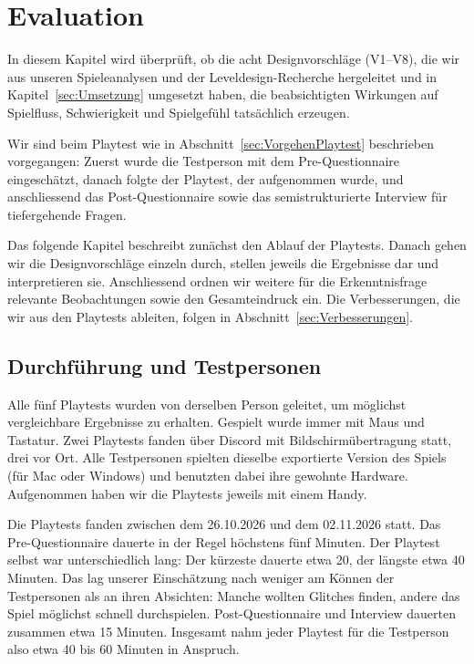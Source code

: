 \documentclass[../Main.tex]{subfiles}
\begin{document}
\section{Evaluation} \label{sec:Evaluation}

In diesem Kapitel wird überprüft, ob die acht Designvorschläge (V1--V8), die wir aus unseren Spieleanalysen und der Leveldesign-Recherche hergeleitet und in Kapitel~\ref{sec:Umsetzung} umgesetzt haben, die beabsichtigten Wirkungen auf Spielfluss, Schwierigkeit und Spielgefühl tatsächlich erzeugen.

Wir sind beim Playtest wie in Abschnitt~\ref{sec:VorgehenPlaytest} beschrieben vorgegangen: Zuerst wurde die Testperson mit dem Pre-Questionnaire eingeschätzt, danach folgte der Playtest, der aufgenommen wurde, und anschliessend das Post-Questionnaire sowie das semistrukturierte Interview für tiefergehende Fragen.

Das folgende Kapitel beschreibt zunächst den Ablauf der Playtests. Danach gehen wir die Designvorschläge einzeln durch, stellen jeweils die Ergebnisse dar und interpretieren sie. Anschliessend ordnen wir weitere für die Erkenntnisfrage relevante Beobachtungen sowie den Gesamteindruck ein. Die Verbesserungen, die wir aus den Playtests ableiten, folgen in Abschnitt~\ref{sec:Verbesserungen}.

\subsection{Durchführung und Testpersonen} \label{sec:Durchfuehrung}

Alle fünf Playtests wurden von derselben Person geleitet, um möglichst vergleichbare Ergebnisse zu erhalten. Gespielt wurde immer mit Maus und Tastatur. Zwei Playtests fanden über Discord mit Bildschirmübertragung statt, drei vor Ort. Alle Testpersonen spielten dieselbe exportierte Version des Spiels (für Mac oder Windows) und benutzten dabei ihre gewohnte Hardware. Aufgenommen haben wir die Playtests jeweils mit einem Handy.

Die Playtests fanden zwischen dem 26.10.2026 und dem 02.11.2026 statt. Das Pre-Questionnaire dauerte in der Regel höchstens fünf Minuten. Der Playtest selbst war unterschiedlich lang: Der kürzeste dauerte etwa 20, der längste etwa 40 Minuten. Das lag unserer Einschätzung nach weniger am Können der Testpersonen als an ihren Absichten: Manche wollten Glitches finden, andere das Spiel möglichst schnell durchspielen. Post-Questionnaire und Interview dauerten zusammen etwa 15 Minuten. Insgesamt nahm jeder Playtest für die Testperson also etwa 40 bis 60 Minuten in Anspruch.
\end{document}
